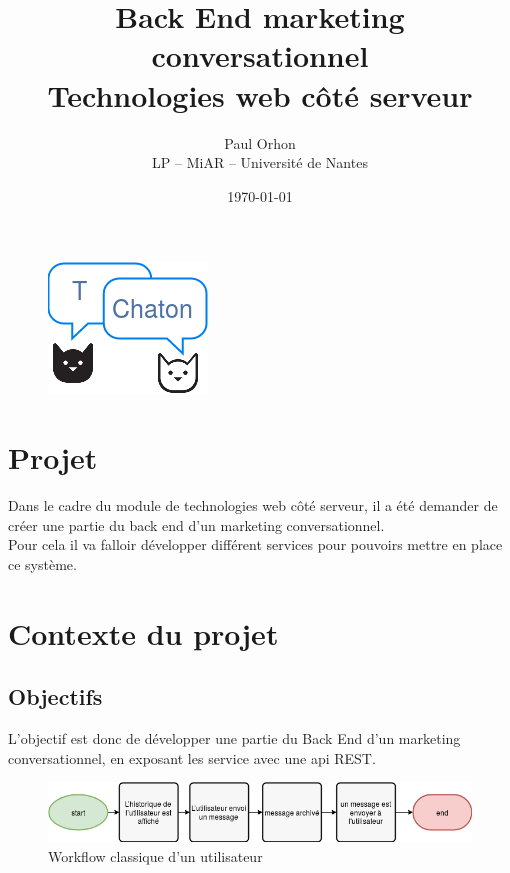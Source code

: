 \documentclass[12pt]{article}
\title{Back End marketing conversationnel\\
    \normalsize Technologies web côté serveur}
\date{\today}
\author{Paul Orhon\\
\small LP -- MiAR -- Université de Nantes }
\begin{document}
\maketitle%
\begin{figure}[h]
    \centering
    \includegraphics[]{img/logo.png}
\end{figure}

\clearpage
\tableofcontents

\listoffigures


\clearpage

\section{Projet}
Dans le cadre du module de technologies web côté serveur, il a été demander de créer une partie du back end d’un marketing conversationnel.
\\

Pour cela il va falloir développer différent services pour pouvoirs mettre en place ce système.



\section{Contexte du projet}
\subsection{Objectifs}
L'objectif est donc de développer une partie du Back End d’un marketing conversationnel, en exposant les service avec une api REST.
\\

\begin{figure}[h]
    \centering
    \includegraphics[width=\linewidth]{img/workflow_user.png}
    \caption{Workflow classique d'un utilisateur}
\end{figure}
\end{document}
